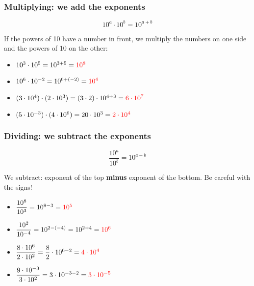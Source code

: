 \subsubsection{Multiplying: we add the exponents}

\begin{equation*}
    10^{a} \cdot 10^{b} = 10^{a+b}
\end{equation*}

If the powers of 10 have a number in front, we multiply the numbers on one side and the powers of 10 on the other:

\begin{example}
    \begin{itemize}
        \item \(10^{3} \cdot 10^{5} = 10^{3+5} = \textcolor{red}{10^{8}}\)
        \item \(10^{6} \cdot 10^{-2} = 10^{6+(-2)} = \textcolor{red}{10^{4}}\)
        \item \((3 \cdot 10^{4}) \cdot (2 \cdot 10^{3}) = (3 \cdot 2) \cdot 10^{4+3} = \textcolor{red}{6 \cdot 10^{7}}\)
        \item \((5 \cdot 10^{-3}) \cdot (4 \cdot 10^{6}) = 20 \cdot 10^{3} = \textcolor{red}{2 \cdot 10^{4}}\)
    \end{itemize}
\end{example}

\subsubsection{Dividing: we subtract the exponents}

\begin{equation*}
    \dfrac{10^{a}}{10^{b}} = 10^{a-b}
\end{equation*}

We subtract: exponent of the top \textbf{minus} exponent of the bottom. Be careful with the signs!

\begin{example}
    \begin{itemize}
        \item \(\dfrac{10^{8}}{10^{3}} = 10^{8-3} = \textcolor{red}{10^{5}}\)
        \item \(\dfrac{10^{2}}{10^{-4}} = 10^{2-(-4)} = 10^{2+4} = \textcolor{red}{10^{6}}\)
        \item \(\dfrac{8 \cdot 10^{6}}{2 \cdot 10^{2}} = \dfrac{8}{2} \cdot 10^{6-2} = \textcolor{red}{4 \cdot 10^{4}}\)
        \item \(\dfrac{9 \cdot 10^{-3}}{3 \cdot 10^{2}} = 3 \cdot 10^{-3-2} = \textcolor{red}{3 \cdot 10^{-5}}\)
    \end{itemize}
\end{example}

